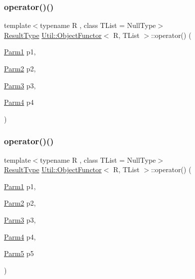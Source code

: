 \subsubsection{\texorpdfstring{operator()()}{operator()()}\hspace{0.1cm}{\footnotesize\ttfamily [10/12]}}
{\footnotesize\ttfamily template$<$typename R , class T\+List  = Null\+Type$>$ \\
\mbox{\hyperlink{classUtil_1_1ObjectFunctor_a77f816e98108848347d0dfc085090a1c}{Result\+Type}} \mbox{\hyperlink{classUtil_1_1ObjectFunctor}{Util\+::\+Object\+Functor}}$<$ R, T\+List $>$\+::operator() (\begin{DoxyParamCaption}\item[{\mbox{\hyperlink{classUtil_1_1ObjectFunctor_a199715d28029627c2ae7219c13b04d26}{Parm1}}}]{p1,  }\item[{\mbox{\hyperlink{classUtil_1_1ObjectFunctor_a6809cf65883dc7575e01d9b9849649cf}{Parm2}}}]{p2,  }\item[{\mbox{\hyperlink{classUtil_1_1ObjectFunctor_a6becd26610c6091b9ba93cd96f3def66}{Parm3}}}]{p3,  }\item[{\mbox{\hyperlink{classUtil_1_1ObjectFunctor_a54ce0b64981cd7f558ce8eea7df3f1b2}{Parm4}}}]{p4 }\end{DoxyParamCaption})\hspace{0.3cm}{\ttfamily [inline]}}

\mbox{\label{classUtil_1_1ObjectFunctor_a95b7e08a92f54e2ce8a90153c1414abd}} 
\subsubsection{\texorpdfstring{operator()()}{operator()()}\hspace{0.1cm}{\footnotesize\ttfamily [11/12]}}
{\footnotesize\ttfamily template$<$typename R , class T\+List  = Null\+Type$>$ \\
\mbox{\hyperlink{classUtil_1_1ObjectFunctor_a77f816e98108848347d0dfc085090a1c}{Result\+Type}} \mbox{\hyperlink{classUtil_1_1ObjectFunctor}{Util\+::\+Object\+Functor}}$<$ R, T\+List $>$\+::operator() (\begin{DoxyParamCaption}\item[{\mbox{\hyperlink{classUtil_1_1ObjectFunctor_a199715d28029627c2ae7219c13b04d26}{Parm1}}}]{p1,  }\item[{\mbox{\hyperlink{classUtil_1_1ObjectFunctor_a6809cf65883dc7575e01d9b9849649cf}{Parm2}}}]{p2,  }\item[{\mbox{\hyperlink{classUtil_1_1ObjectFunctor_a6becd26610c6091b9ba93cd96f3def66}{Parm3}}}]{p3,  }\item[{\mbox{\hyperlink{classUtil_1_1ObjectFunctor_a54ce0b64981cd7f558ce8eea7df3f1b2}{Parm4}}}]{p4,  }\item[{\mbox{\hyperlink{classUtil_1_1ObjectFunctor_a8428e04dd3fb91bc7f7c518a1771eecb}{Parm5}}}]{p5 }\end{DoxyParamCaption})\hspace{0.3cm}{\ttfamily [inline]}}

